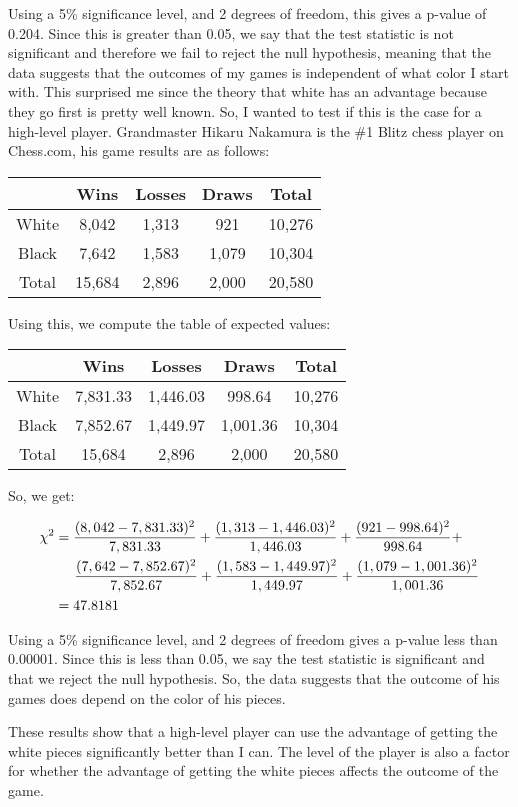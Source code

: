\documentclass[letterpaper, 11pt]{article}
\begin{document}
Using a 5\% significance level, and 2 degrees of freedom, this gives a p-value of 0.204. Since this is greater than 0.05, we say that the test statistic is not significant and therefore we fail to reject the null hypothesis, meaning that the data suggests that the outcomes of my games is independent of what color I start with. This surprised me since the theory that white has an advantage because they go first is pretty well known. So, I wanted to test if this is the case for a high-level player. Grandmaster Hikaru Nakamura is the \#1 Blitz chess player on Chess.com, his game results are as follows:

\begin{center}

\begin{tabular}{ |c|c|c|c|c| } 
 \hline
 & Wins & Losses & Draws & Total\\
 \hline
 White & 8,042 & 1,313 & 921 & 10,276\\
 \hline
 Black & 7,642 & 1,583 & 1,079 & 10,304\\
 \hline
 Total & 15,684 & 2,896 & 2,000 & 20,580\\
 \hline
\end{tabular}

\end{center}

Using this, we compute the table of expected values:

\begin{center}

\begin{tabular}{ |c|c|c|c|c| } 
 \hline
 & Wins & Losses & Draws & Total\\
 \hline
 White & 7,831.33 & 1,446.03 & 998.64 & 10,276\\
 \hline
 Black & 7,852.67 & 1,449.97 & 1,001.36 & 10,304\\
 \hline
 Total & 15,684 & 2,896 & 2,000 & 20,580\\
 \hline
\end{tabular}

\end{center}

So, we get:

\begin{align*}
\chi^2 & = \frac{(8,042 - 7,831.33)^2}{7,831.33} + \frac{(1,313 - 1,446.03)^2}{1,446.03} + \frac{(921 - 998.64)^2}{998.64} +\\
& \hspace{0.5cm} \frac{(7,642 - 7,852.67)^2}{7,852.67} + \frac{(1,583 - 1,449.97)^2}{1,449.97} + \frac{(1,079 - 1,001.36)^2}{1,001.36}\\
 & = 47.8181
\end{align*}

Using a 5\% significance level, and 2 degrees of freedom gives a p-value less than 0.00001. Since this is less than 0.05, we say the test statistic is significant and that we reject the null hypothesis. So, the data suggests that the outcome of his games does depend on the color of his pieces.

These results show that a high-level player can use the advantage of getting the white pieces significantly better than I can. The level of the player is also a factor for whether the advantage of getting the white pieces affects the outcome of the game.
\end{document}
